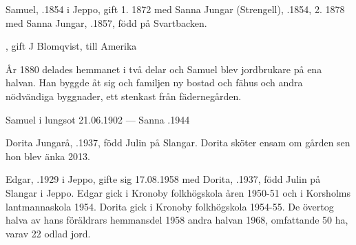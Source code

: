 Samuel, .1854 i Jeppo, gift 1. 1872 med Sanna Jungar (Strengell), .1854, 2. 1878 med Sanna Jungar, .1857, född på Svartbacken.
\begin{jhchildren}
  \item {}
  \item {}
  \item {}
  \item {}
  \item {}
  \item {}
  \item {}
  \item {}
  \item {}, gift J Blomqvist, till Amerika
  \item {}
  \item {}
  \item {}
\end{jhchildren}
År 1880 delades hemmanet i två delar och Samuel blev jordbrukare på ena halvan. Han byggde åt sig och familjen ny bostad och fähus och andra nödvändiga byggnader, ett stenkast från fädernegården.

Samuel \textdied i lungsot 21.06.1902  ---  Sanna .1944





Dorita Jungarå, .1937, född Julin på Slangar. Dorita sköter ensam om gården sen hon blev änka 2013.\jhvspace{}



Edgar, .1929 i Jeppo, gifte sig 17.08.1958 med Dorita, .1937, född Julin på Slangar i Jeppo.
Edgar gick i Kronoby folkhögskola åren 1950-51 och i Korsholms lantmannaskola 1954. Dorita gick i Kronoby folkhögskola 1954-55. De övertog halva av hans föräldrars hemmansdel 1958 andra halvan 1968, omfattande 50 ha, varav 22 odlad jord.

